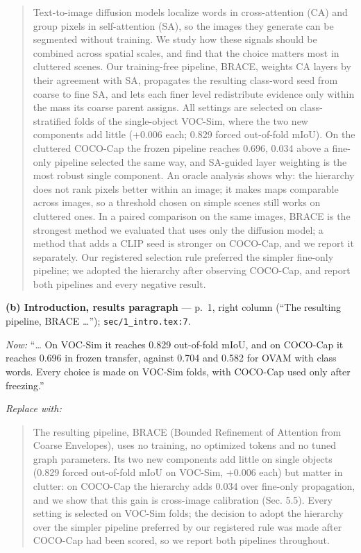 \documentclass[
  10pt,
]{article}
\begin{document}
\begin{quote}
Text-to-image diffusion models localize words in cross-attention (CA)
and group pixels in self-attention (SA), so the images they generate can
be segmented without training. We study how these signals should be
combined across spatial scales, and find that the choice matters most in
cluttered scenes. Our training-free pipeline, BRACE, weights CA layers
by their agreement with SA, propagates the resulting class-word seed
from coarse to fine SA, and lets each finer level redistribute evidence
only within the mass its coarse parent assigns. All settings are
selected on class-stratified folds of the single-object VOC-Sim, where
the two new components add little (+0.006 each; 0.829 forced out-of-fold
mIoU). On the cluttered COCO-Cap the frozen pipeline reaches 0.696,
0.034 above a fine-only pipeline selected the same way, and SA-guided
layer weighting is the most robust single component. An oracle analysis
shows why: the hierarchy does not rank pixels better within an image; it
makes maps comparable across images, so a threshold chosen on simple
scenes still works on cluttered ones. In a paired comparison on the same
images, BRACE is the strongest method we evaluated that uses only the
diffusion model; a method that adds a CLIP seed is stronger on COCO-Cap,
and we report it separately. Our registered selection rule preferred the
simpler fine-only pipeline; we adopted the hierarchy after observing
COCO-Cap, and report both pipelines and every negative result.
\end{quote}

\textbf{(b) Introduction, results paragraph} --- p.~1, right column
(``The resulting pipeline, BRACE \ldots{}'');
\texttt{sec/1\_intro.tex:7}.

\emph{Now:} ``\ldots{} On VOC-Sim it reaches 0.829 out-of-fold mIoU, and
on COCO-Cap it reaches 0.696 in frozen transfer, against 0.704 and 0.582
for OVAM with class words. Every choice is made on VOC-Sim folds, with
COCO-Cap used only after freezing.''

\emph{Replace with:}

\begin{quote}
The resulting pipeline, BRACE (Bounded Refinement of Attention from
Coarse Envelopes), uses no training, no optimized tokens and no tuned
graph parameters. Its two new components add little on single objects
(0.829 forced out-of-fold mIoU on VOC-Sim, +0.006 each) but matter in
clutter: on COCO-Cap the hierarchy adds 0.034 over fine-only
propagation, and we show that this gain is cross-image calibration (Sec.
5.5). Every setting is selected on VOC-Sim folds; the decision to adopt
the hierarchy over the simpler pipeline preferred by our registered rule
was made after COCO-Cap had been scored, so we report both pipelines
throughout.
\end{quote}
\end{document}
